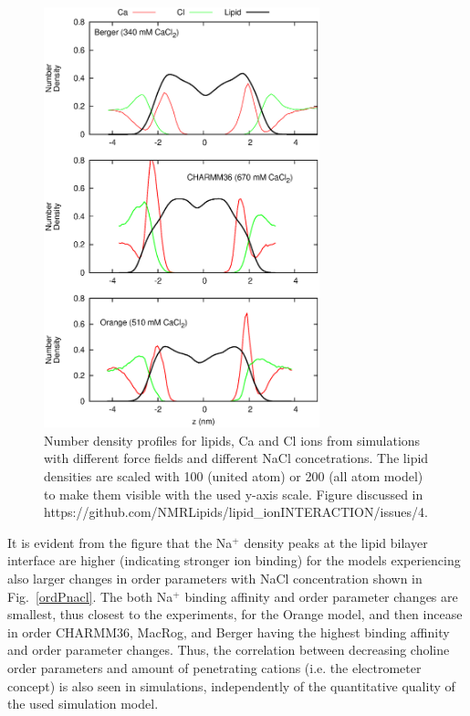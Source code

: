 \documentclass[pre,aps,floatfix,authordate1-4,twocolumn]{revtex4-1}
\begin{document}
\begin{figure}[]
  \centering
  \includegraphics[width=8cm]{../Fig/CAdensities.eps}
  \caption{\label{IONdensCOMP}
    Number density profiles for lipids, Ca and Cl ions from simulations with different force fields and different NaCl concetrations. 
    The lipid densities are scaled with 100 (united atom) or 200 (all atom model) to make them visible with the used y-axis scale.
    Figure discussed in https://github.com/NMRLipids/lipid\_ionINTERACTION/issues/4.
  }
\end{figure}
It is evident from the figure that the Na$^+$ density peaks at the lipid bilayer interface are higher (indicating stronger ion binding) for the models
experiencing also larger changes in order parameters with NaCl concentration shown in Fig.~\ref{ordPnacl}. 
The both Na$^+$ binding affinity and order parameter changes are smallest, thus closest to the experiments, for the Orange model, and then incease 
in order CHARMM36, MacRog, and Berger having the highest binding affinity and order parameter changes.
Thus, the correlation between decreasing choline order parameters
and amount of penetrating cations (i.e. the electrometer concept) is also seen in simulations, independently of the quantitative quality of the used simulation model.
\end{document}
